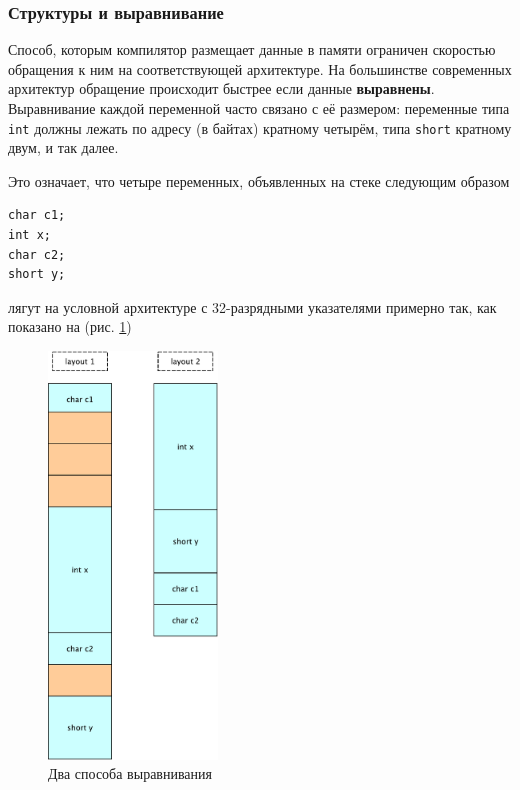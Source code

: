 \documentclass[a4paper,12pt,oneside]{article}
\begin{document}
\subsubsection{Структуры и выравнивание}

Способ, которым компилятор размещает данные в памяти ограничен скоростью обращения к ним на соответствующей архитектуре. На большинстве современных архитектур обращение происходит быстрее если данные \textbf{выравнены}. Выравнивание каждой переменной часто связано с её размером: переменные типа \lstinline!int! должны лежать по адресу (в байтах) кратному четырём, типа \lstinline!short! кратному двум, и так далее.

Это означает, что четыре переменных, объявленных на стеке следующим образом

\begin{lstlisting}
char c1;
int x;
char c2;
short y;
\end{lstlisting}

лягут на условной архитектуре с 32-разрядными указателями примерно так, как показано на (рис. \ref{fig:alignment})

\begin{figure}[h!]
\centering
\includegraphics[width=0.4\textwidth]{illustrations/alignment-crop.pdf}
\caption{Два способа выравнивания}
\label{fig:alignment}
\end{figure}
\end{document}
